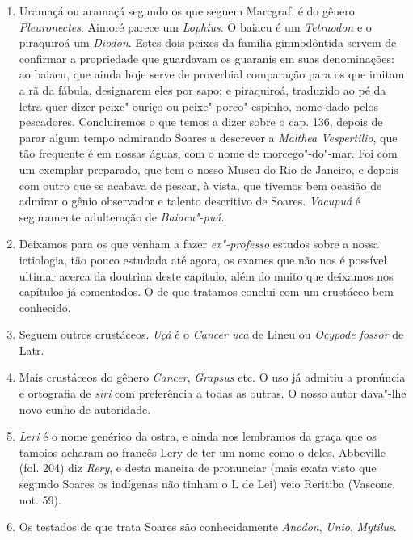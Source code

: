 \begin{enumerate}
\item Uramaçá ou aramaçá segundo os que seguem Marcgraf, é do gênero \textit{Pleuronectes}. 
Aimoré parece um \textit{Lophius}. O baiacu é um \textit{Tetraodon} e o piraquiroá 
um \textit{Diodon}. Estes dois peixes da família gimnodôntida servem de confirmar a 
propriedade que guardavam os guaranis em suas denominações: ao baiacu, que ainda 
hoje serve de proverbial comparação para os que imitam a rã da fábula, designarem 
eles por sapo; e piraquiroá, traduzido ao pé da letra quer dizer peixe"-ouriço ou 
peixe"-porco"-espinho, nome dado pelos pescadores. Concluiremos o que temos a dizer sobre o 
cap. 136, depois de parar algum tempo admirando Soares a descrever a \textit{Malthea Vespertilio}, 
que tão frequente é em nossas águas, com o nome de morcego"-do"-mar. Foi 
com um exemplar preparado, que tem o nosso Museu do Rio de Janeiro, e depois com 
outro que se acabava de pescar, à vista, que tivemos bem ocasião de admirar o gênio 
observador e talento descritivo de Soares. \textit{Vacupuá} é seguramente adulteração de 
\textit{Baiacu"-puá}.

\item Deixamos para os que venham a fazer \textit{ex"-professo} estudos sobre a nossa 
ictiologia, tão pouco estudada até agora, os exames que não nos é possível ultimar 
acerca da doutrina deste capítulo, além do muito que deixamos nos capítulos já 
comentados. O de que tratamos conclui com um crustáceo bem conhecido.

\item Seguem outros crustáceos. \textit{Uçá} é o \textit{Cancer uca} de Lineu ou \textit{Ocypode fossor} de Latr.

\item Mais crustáceos do gênero \textit{Cancer}, \textit{Grapsus} etc. O uso já admitiu a pronúncia 
e ortografia de \textit{siri} com preferência a todas as outras. O nosso autor dava"-lhe novo 
cunho de autoridade.

\item \textit{Leri} é o nome genérico da ostra, e ainda nos lembramos da graça que os tamoios 
acharam ao francês Lery de ter um nome como o deles. Abbeville (fol. 204) diz \textit{Rery}, e 
desta maneira de pronunciar (mais exata visto que segundo Soares os indígenas não 
tinham o L de Lei) veio Reritiba (Vasconc. not. 59).

\item Os testados de que trata Soares são conhecidamente \textit{Anodon}, \textit{Unio}, \textit{Mytilus}.


\end{enumerate}
